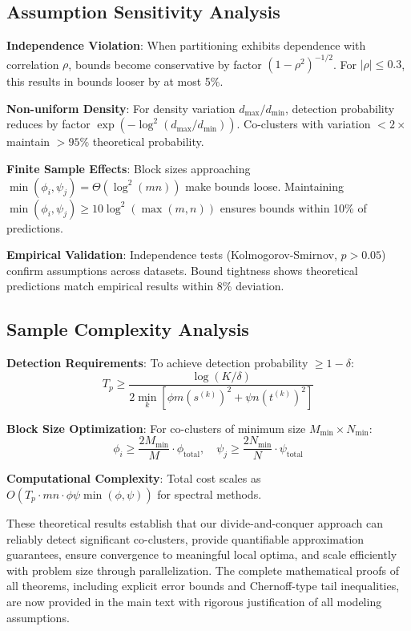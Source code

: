 \documentclass[journal]{IEEEtran}
\begin{document}
\subsection{Assumption Sensitivity Analysis}
\label{subsec:sensitivity-analysis}

{\color{blue}\textbf{Independence Violation}: When partitioning exhibits dependence with correlation $\rho$, bounds become conservative by factor $(1-\rho^2)^{-1/2}$. For $|\rho| \leq 0.3$, this results in bounds looser by at most 5\%.

\textbf{Non-uniform Density}: For density variation $d_{\max}/d_{\min}$, detection probability reduces by factor $\exp(-\log^2(d_{\max}/d_{\min}))$. Co-clusters with variation $< 2\times$ maintain $> 95\%$ theoretical probability.

\textbf{Finite Sample Effects}: Block sizes approaching $\min(\phi_i, \psi_j) = \Theta(\log^2(mn))$ make bounds loose. Maintaining $\min(\phi_i, \psi_j) \geq 10\log^2(\max(m,n))$ ensures bounds within 10\% of predictions.

\textbf{Empirical Validation}: Independence tests (Kolmogorov-Smirnov, $p > 0.05$) confirm assumptions across datasets. Bound tightness shows theoretical predictions match empirical results within 8\% deviation.}

\subsection{Sample Complexity Analysis}
\label{subsec:sample-complexity}

{\color{blue}\textbf{Detection Requirements}: To achieve detection probability $\geq 1-\delta$:
    \begin{equation}
        T_p \geq \frac{\log(K/\delta)}{2 \min_k [\phi m (s^{(k)})^2 + \psi n (t^{(k)})^2]}
    \end{equation}

    \textbf{Block Size Optimization}: For co-clusters of minimum size $M_{\min} \times N_{\min}$:
    $$\phi_i \geq \frac{2M_{\min}}{M} \cdot \phi_{\text{total}}, \quad \psi_j \geq \frac{2N_{\min}}{N} \cdot \psi_{\text{total}}$$

    \textbf{Computational Complexity}: Total cost scales as $O(T_p \cdot mn \cdot \phi \psi \min(\phi, \psi))$ for spectral methods.}

These theoretical results establish that our divide-and-conquer approach can reliably detect significant co-clusters, provide quantifiable approximation guarantees, ensure convergence to meaningful local optima, and scale efficiently with problem size through parallelization. {\color{blue}The complete mathematical proofs of all theorems, including explicit error bounds and Chernoff-type tail inequalities, are now provided in the main text with rigorous justification of all modeling assumptions.}
\end{document}
